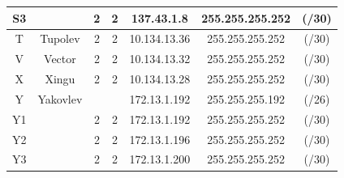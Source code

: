 \documentclass[12pt, a4paper, spanish]{article}
\begin{document}
\begin{center}
\begin{tabular}{|c|c|c|c|c|c c|}
	\hline
	S3 & 			& 2 & 2 		& 137.43.1.8 	& 255.255.255.252 & (/30) \\
	\hline
	T & Tupolev 		& 2 & 2 		& 10.134.13.36 	& 255.255.255.252 & (/30) \\
	\hline
	V & Vector 		& 2 & 2 		& 10.134.13.32 	& 255.255.255.252 & (/30) \\
	\hline
	X & Xingu 		& 2 & 2 		& 10.134.13.28 	& 255.255.255.252 & (/30) \\
	\hline
	Y & Yakovlev 	& & 			& 172.13.1.192 	& 255.255.255.192 & (/26) \\
	\hline
	Y1 & 			& 2 & 2 		& 172.13.1.192 	& 255.255.255.252 & (/30) \\
	\hline
	Y2 & 			& 2 & 2 		& 172.13.1.196 	& 255.255.255.252 & (/30) \\
	\hline
	Y3 & 			& 2 & 2 		& 172.13.1.200 	& 255.255.255.252 & (/30) \\
	\hline
\end{tabular}
\end{center}

\newpage
\end{document}
